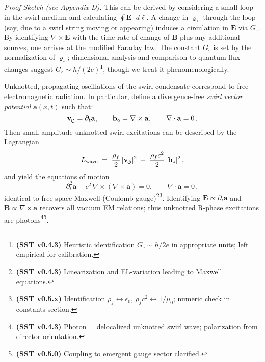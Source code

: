 \documentclass[reprint,aps,onecolumn,nofootinbib]{revtex4-2}
\newcommand{\swirlarrow}{%
    \mathchoice{\mkern-2mu\scriptstyle\boldsymbol{\circlearrowleft}}%
    {\mkern-2mu\scriptstyle\boldsymbol{\circlearrowleft}}%
    {\mkern-2mu\scriptscriptstyle\boldsymbol{\circlearrowleft}}%
    {\mkern-2mu\scriptscriptstyle\boldsymbol{\circlearrowleft}}%
}
\newcommand{\vswirl}{\mathbf{v}_{\swirlarrow}}
\begin{document}
    \noindent \textit{Proof Sketch (see Appendix D).} This can be derived by considering a small loop in the swirl medium and calculating $\oint \mathbf{E}\cdot d\ell$. A change in $\varrho_{\circ}$ through the loop (say, due to a swirl string moving or appearing) induces a circulation in $\mathbf{E}$ via $G_{\circ}$. By identifying $\nabla \times \mathbf{E}$ with the time rate of change of $\mathbf{B}$ plus any additional sources, one arrives at the modified Faraday law. The constant $G_{\circ}$ is set by the normalization of $\varrho_{\circ}$; dimensional analysis and comparison to quantum flux changes suggest $G_{\circ}\sim h/(2e)$\footnote{\textbf{(SST v0.4.3)} Heuristic identification $G_{\circ}\sim h/2e$ in appropriate units; left empirical for calibration.}, though we treat it phenomenologically.

    \begin{tcolorbox}[title=Corollary 4.2: Photon as a Swirl Wave]
    Unknotted, propagating oscillations of the swirl condensate correspond to free electromagnetic radiation. In particular, define a divergence-free \emph{swirl vector potential} $\mathbf{a}(x,t)$ such that:
    \[
        \vswirl = \partial_t \mathbf{a}, \qquad
        \mathbf{b}_{\circ} = \nabla \times \mathbf{a}, \qquad
        \nabla\cdot \mathbf{a} = 0\,.
    \]
    Then small-amplitude unknotted swirl excitations can be described by the Lagrangian
    \[
        L_{\text{wave}} \;=\; \frac{\rho_f}{2}\,|\vswirl|^2 \;-\; \frac{\rho_f c^2}{2}\,|\mathbf{b}_{\circ}|^2\,,
    \]
    and yield the equations of motion
    \[
        \partial_t^2 \mathbf{a} - c^2 \,\nabla \times (\nabla \times \mathbf{a}) = 0, \qquad \nabla \cdot \mathbf{a} = 0\,,
    \]
    identical to free-space Maxwell (Coulomb gauge)\footnote{\textbf{(SST v0.4.3)} Linearization and EL-variation leading to Maxwell equations.}\footnote{\textbf{(SST v0.5.x)} Identification $\rho_f\leftrightarrow\epsilon_0$, $\rho_fc^2\leftrightarrow 1/\mu_0$; numeric check in constants section.}. Identifying $\mathbf{E} \propto \partial_t \mathbf{a}$ and $\mathbf{B}\propto \nabla \times \mathbf{a}$ recovers all vacuum EM relations; thus unknotted R-phase excitations are photons\footnote{\textbf{(SST v0.4.3)} Photon = delocalized unknotted swirl wave; polarization from director orientation.}\footnote{\textbf{(SST v0.5.0)} Coupling to emergent gauge sector clarified.}.
    \end{tcolorbox}
\end{document}
